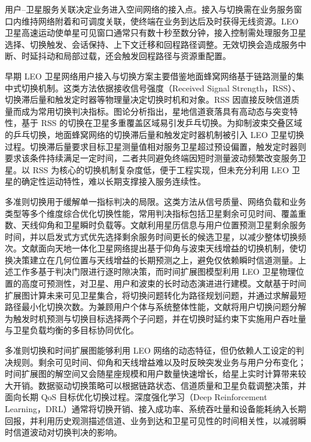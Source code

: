 用户--卫星服务关联决定业务进入空间网络的接入点。接入与切换需在业务服务窗口内维持网络附着和可调度关联，使终端在业务到达后及时获得无线资源。LEO 卫星高速运动使单星可见窗口通常只有数十秒至数分钟\cite{park2025jointoptimizationhandoffvideo,li-skycastle-infocom24}，接入控制需处理服务卫星选择、切换触发、会话保持、上下文迁移和回程路径调整。无效切换会造成服务中断、时延抖动和局部过载，还会触发回程路径与资源重配置\cite{ji-mobilityManagement-Network2021,kim-HOChallenge-ICTC24}。

早期 LEO 卫星网络用户接入与切换方案主要借鉴地面蜂窝网络基于链路测量的集中式切换机制。这类方法依据接收信号强度（Received Signal Strength，RSS）、切换滞后量和触发定时器等物理量决定切换时机和对象\cite{Liu-HOReview-ICCCAS24}。RSS 因直接反映信道质量而成为常用切换判决指标。图论分析\cite{jiang-HOGraph-IJAE23}指出，星地信道衰落具有高动态与突变特性，基于 RSS 的切换在卫星多重覆盖区域易引发乒乓切换。为抑制波束交叠区域的乒乓切换，地面蜂窝网络的切换滞后量和触发定时器机制被引入 LEO 卫星切换过程\cite{zhang-interferenceHOSTN-FCN23}。切换滞后量要求目标卫星测量值相对服务卫星超过预设偏置，触发定时器则要求该条件持续满足一定时间，二者共同避免终端因短时测量波动频繁改变服务卫星。以 RSS 为核心的切换机制复杂度低，便于工程实现，但未充分利用 LEO 卫星的确定性运动特性，难以长期支撑接入服务连续性。

多准则切换用于缓解单一指标判决的局限。这类方法从信号质量、网络负载和业务类型等多个维度综合优化切换性能，常用判决指标包括卫星剩余可见时间、覆盖重数、天线仰角和卫星瞬时负载等。文献\cite{Li-userHOLEO-ComLetter20}利用星历信息与用户位置预测卫星剩余服务时间，并以启发式方式优先选择剩余服务时间更长的候选卫星，以减少整体切换频次。文献\cite{Juan-HO5GLEO-Access2022}面向天地一体化卫星网络提出基于仰角与波束天线增益的切换机制，使切换决策建立在几何位置与天线增益的长期预测之上，避免仅依赖瞬时信道测量。上述工作多基于判决门限进行逐时隙决策，而时间扩展图模型\cite{hu-evolvingGraphHo-Jcom18}利用 LEO 卫星物理位置的高度可预测性，对卫星、用户和波束的长时动态演进进行建模。文献\cite{wu-graphHO-CommsLetters16}基于时间扩展图计算未来可见卫星集合，将切换问题转化为路径规划问题，并通过求解最短路径最小化切换次数。为兼顾用户个体与系统整体性能，文献\cite{dai-MOHO-ICCWorkshops22}将用户切换问题分解为触发时机预测与切换目标选择两个子问题，并在切换时延约束下实施用户吞吐量与卫星负载均衡的多目标协同优化。

多准则切换和时间扩展图能够利用 LEO 网络的动态特征，但仍依赖人工设定的判决规则。剩余可见时间、仰角和天线增益难以及时反映突发业务与用户分布变化；时间扩展图的解空间又会随星座规模和用户数量快速增长，给星上实时计算带来较大开销。数据驱动切换策略可以根据链路状态、信道质量和卫星负载调整决策，并面向长期 QoS 目标优化切换过程。深度强化学习（Deep Reinforcement Learning，DRL）通常将切换开销、接入成功率、系统吞吐量和设备能耗纳入长期回报，并利用历史观测描述信道、业务到达和卫星可见性的时间相关性，以减弱瞬时信道波动对切换判决的影响。

